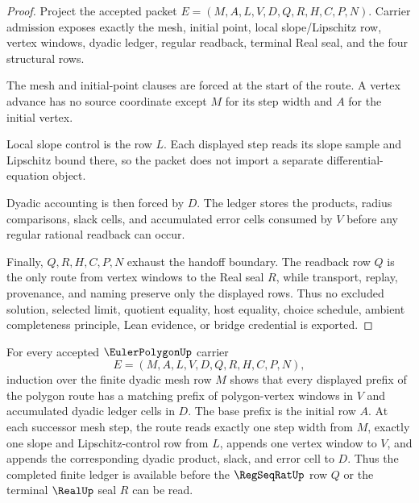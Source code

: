 \begin{proof}
Project the accepted packet $E=(M,A,L,V,D,Q,R,H,C,P,N)$. Carrier admission exposes exactly the mesh, initial point, local slope/Lipschitz row, vertex windows, dyadic ledger, regular readback, terminal Real seal, and the four structural rows.

The mesh and initial-point clauses are forced at the start of the route. A vertex advance has no source coordinate except $M$ for its step width and $A$ for the initial vertex.

Local slope control is the row $L$. Each displayed step reads its slope sample and Lipschitz bound there, so the packet does not import a separate differential-equation object.

Dyadic accounting is then forced by $D$. The ledger stores the products, radius comparisons, slack cells, and accumulated error cells consumed by $V$ before any regular rational readback can occur.

Finally, $Q,R,H,C,P,N$ exhaust the handoff boundary. The readback row $Q$ is the only route from vertex windows to the Real seal $R$, while transport, replay, provenance, and naming preserve only the displayed rows. Thus no excluded solution, selected limit, quotient equality, host equality, choice schedule, ambient completeness principle, Lean evidence, or bridge credential is exported.
\end{proof}
\begin{theorem}
\label{thm:euler-polygon-step-ledger-induction}
For every accepted $\EulerPolygonUp$ carrier
$$
E=(M,A,L,V,D,Q,R,H,C,P,N),
$$
induction over the finite dyadic mesh row $M$ shows that every displayed prefix of the polygon route has a matching prefix of polygon-vertex windows in $V$ and accumulated dyadic ledger cells in $D$. The base prefix is the initial row $A$. At each successor mesh step, the route reads exactly one step width from $M$, exactly one slope and Lipschitz-control row from $L$, appends one vertex window to $V$, and appends the corresponding dyadic product, slack, and error cell to $D$. Thus the completed finite ledger is available before the $\RegSeqRatUp$ row $Q$ or the terminal $\RealUp$ seal $R$ can be read.
\end{theorem}
